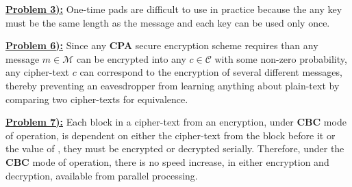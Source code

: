 \documentclass{article}[12]
\numberwithin{equation}{section}
\newcommand{\numbpr}[1]{\setcounter{section}{#1} \setcounter{equation}{0}}
\newcommand{\prob}[1]{\textbf{\underline{Problem #1):}}}
\begin{document}
\begin{flushleft}





\vspace{0.25 in}





\vspace{0.25in}


\numbpr{3}
\prob{3} One-time pads are difficult to use in practice because the any key must be the same length as the message and each key can be used only once. \newline


\vspace{0.25in}





\vspace{0.25in}





\vspace{0.25in}


\numbpr{6} 
\prob{6} Since any \textbf{CPA} secure encryption scheme requires than any message $m \in \mathcal{M}$ can be encrypted into any $c \in \mathcal{C}$ with some non-zero probability, any cipher-text $c$ can correspond to the encryption of several different messages, thereby preventing an eavesdropper from learning anything about plain-text by comparing two cipher-texts for equivalence. \newline


\vspace{0.25in}


\numbpr{7}
\prob{7} Each block in a cipher-text from an encryption, under \textbf{CBC} mode of operation, is dependent on either the cipher-text from the block before it or the value of , they must be encrypted or decrypted serially.  Therefore, under the \textbf{CBC} mode of operation, there is no speed increase, in either encryption and decryption, available from parallel processing. \newline


\vspace{0.25in}





\vspace{0.25in}







\end{flushleft}
\end{document}
